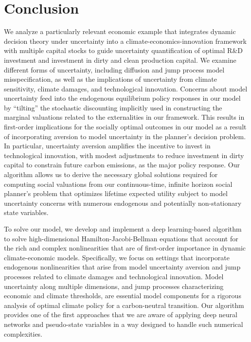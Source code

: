 \documentclass[12pt]{article}
\begin{document}





\section{Conclusion}

We analyze a particularly relevant economic example that integrates dynamic decision theory under uncertainty into a climate-economics-innovation framework with multiple capital stocks to guide uncertainty quantification of optimal R\&D investment and investment in dirty and clean production capital. We examine different forms of uncertainty, including diffusion and jump process model misspecification, as well as the implications of uncertainty from climate sensitivity, climate damages, and technological innovation. Concerns about model uncertainty feed into the endogenous equilibrium policy responses in our model by ``tilting'' the stochastic discounting implicitly used in constructing the marginal valuations related to the externalities in our framework. This results in first-order implications for the socially optimal outcomes in our model as a result of incorporating aversion to model uncertainty in the planner's decision problem. In particular, uncertainty aversion amplifies the incentive to invest in technological innovation, with modest adjustments to reduce investment in dirty capital to constrain future carbon emissions, as the major policy response. Our algorithm allows us to derive the necessary global solutions required for computing social valuations from our continuous-time, infinite horizon social planner's problem that optimizes lifetime expected utility subject to model uncertainty concerns with numerous endogenous and potentially non-stationary state variables.

To solve our model, we develop and implement a deep learning-based algorithm to solve high-dimensional Hamilton-Jacobi-Bellman equations that account for the rich and complex nonlinearities that are of first-order importance in dynamic climate-economic models. Specifically, we focus on settings that incorporate endogenous nonlinearities that arise from model uncertainty aversion and jump processes related to climate damages and technological innovation. Model uncertainty along multiple dimensions, and jump processes characterizing economic and climate thresholds, are essential model components for a rigorous analysis of optimal climate policy for a carbon-neutral transition. Our algorithm provides one of the first approaches that we are aware of applying deep neural networks and pseudo-state variables in a way designed to handle such numerical complexities.
\end{document}
